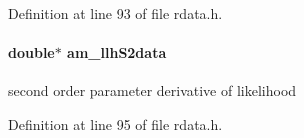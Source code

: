 Definition at line 93 of file rdata.\+h.

\hypertarget{struct_return_data_a9ea6527fa5408fa1ae074cdbd83ed11f}{}
\paragraph[{am\+\_\+llh\+S2data}]{\setlength{\rightskip}{0pt plus 5cm}double$\ast$ am\+\_\+llh\+S2data}\label{struct_return_data_a9ea6527fa5408fa1ae074cdbd83ed11f}
second order parameter derivative of likelihood 

Definition at line 95 of file rdata.\+h.

